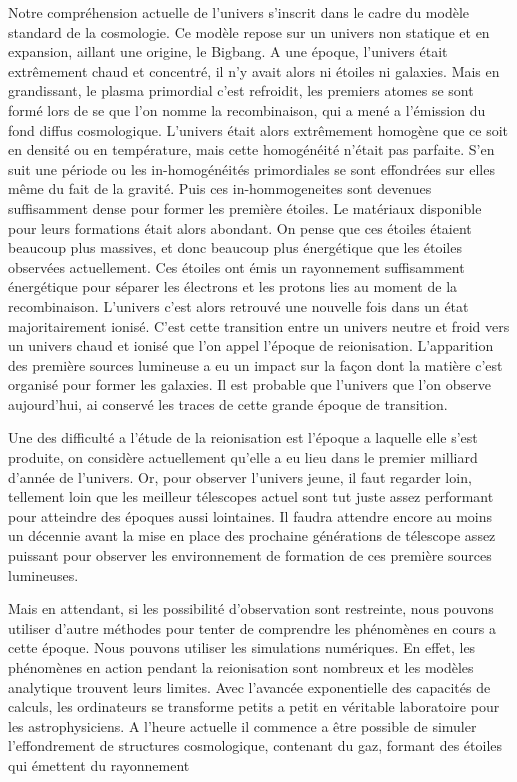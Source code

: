Notre compréhension actuelle de l'univers s'inscrit dans le cadre du modèle standard de la cosmologie.
Ce modèle repose sur un univers non statique et en expansion, aillant une origine, le Bigbang.
A une époque, l'univers était extrêmement chaud et concentré, il n'y avait alors ni étoiles ni galaxies.
Mais en grandissant,  le plasma primordial c'est refroidit, les premiers atomes se sont formé lors de se que l'on nomme la recombinaison, qui a mené a l'émission du fond diffus cosmologique.
L'univers était alors extrêmement homogène que ce soit en densité ou en température, mais cette homogénéité n'était pas parfaite.
S'en suit une période ou les in-homogénéités primordiales se sont effondrées sur elles même du fait de la gravité.
Puis ces in-hommogeneites sont devenues suffisamment dense pour former les première étoiles.
Le matériaux disponible pour leurs formations était alors abondant.
On pense que ces étoiles étaient beaucoup plus massives, et donc beaucoup plus énergétique que les étoiles observées actuellement.
Ces étoiles ont émis un rayonnement suffisamment énergétique pour séparer les électrons et les protons lies au moment de la recombinaison.
L'univers c'est alors retrouvé une nouvelle fois dans un état majoritairement ionisé. 
C'est cette transition entre un univers neutre et froid vers un univers chaud et ionisé que l'on appel l'époque de reionisation.
L'apparition des première sources lumineuse a eu un impact sur la façon dont la matière c'est organisé pour former les galaxies.
Il est probable que l'univers que l'on observe aujourd'hui, ai conservé les traces de cette grande époque de transition.

Une des difficulté a l'étude de la reionisation est l'époque a laquelle elle s'est produite, on considère actuellement qu'elle a eu lieu dans le premier milliard d'année de l'univers.
Or, pour observer l'univers jeune, il faut regarder loin, tellement loin que les meilleur télescopes actuel sont tut juste assez performant pour atteindre des époques aussi lointaines.
Il faudra attendre encore au moins un décennie avant la mise en place des prochaine générations de télescope assez puissant pour observer les environnement de formation de ces première sources lumineuses.

Mais en attendant, si les possibilité d'observation sont restreinte, nous pouvons utiliser d'autre méthodes pour tenter de comprendre les phénomènes en cours a cette époque.
Nous pouvons utiliser les simulations numériques.
En effet, les phénomènes en action pendant la reionisation sont nombreux et les modèles analytique trouvent leurs limites.
Avec l'avancée exponentielle des capacités de calculs, les ordinateurs se transforme petits a petit en véritable laboratoire pour les astrophysiciens.
A l'heure actuelle il commence a être possible de simuler l'effondrement de structures cosmologique, contenant du gaz, formant des étoiles qui émettent du rayonnement 

